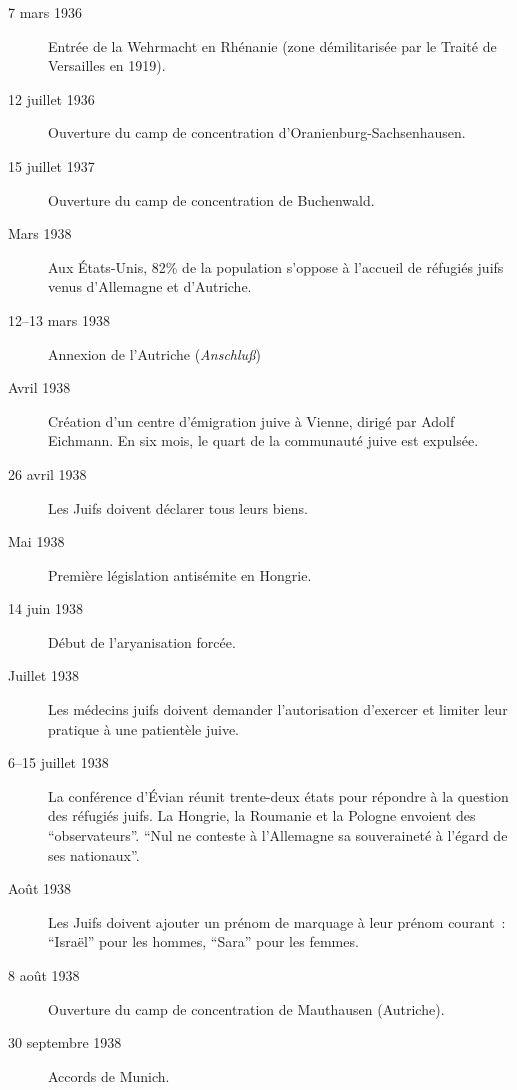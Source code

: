 \begin{description}
    \item[7 mars 1936] Entrée de la Wehrmacht en Rhénanie (zone démilitarisée par le Traité de Versailles en 1919).

    \item[12 juillet 1936] Ouverture du camp de concentration d'Oranienburg-Sachsenhausen.

    \item[15 juillet 1937] Ouverture du camp de concentration de Buchenwald.
    
    \item[Mars 1938] Aux États-Unis, 82\%{} de la population s'oppose à l'accueil de réfugiés juifs venus d'Allemagne et d'Autriche.
    
    \item[12--13 mars 1938] Annexion de l'Autriche (\textit{Anschlu\ss{}})

    \item[Avril 1938] Création d'un centre d'émigration juive à Vienne, dirigé par Adolf Eichmann. En six mois, le quart de la communauté juive est expulsée.
    
    \item[26 avril 1938] Les Juifs doivent déclarer tous leurs biens.
    
    \item[Mai 1938] Première législation antisémite en Hongrie.
    
    \item[14 juin 1938] Début de l'aryanisation forcée.

    \item[Juillet 1938] Les médecins juifs doivent demander l'autorisation d'exercer et limiter leur pratique à une patientèle juive.
    
    \item[6--15 juillet 1938] La conférence d'Évian réunit trente-deux états pour répondre à la question des réfugiés juifs. La Hongrie, la Roumanie et la Pologne envoient des \enquote{observateurs}. \enquote{Nul ne conteste à l'Allemagne sa souveraineté à l'égard de ses nationaux}.

    \item[Août 1938] Les Juifs doivent ajouter un prénom de marquage à leur prénom courant~: \enquote{Israël} pour les hommes, \enquote{Sara} pour les femmes.
    
    \item[8 août 1938] Ouverture du camp de concentration de Mauthausen (Autriche).

    \item[30 septembre 1938] Accords de Munich.
    

\end{description}
